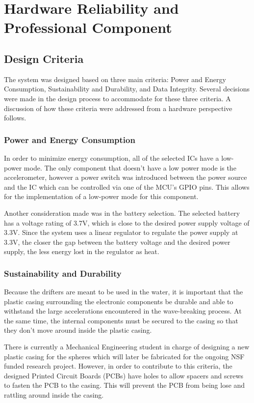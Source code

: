 \section{Hardware Reliability and Professional Component}

\subsection{Design Criteria}
The system was designed based on three main criteria: Power and Energy Consumption, Sustainability and Durability, and Data Integrity.  Several decisions were made in the design process to accommodate for these three criteria.  A discussion of how these criteria were addressed from a hardware perspective follows.

\subsubsection{Power and Energy Consumption}
In order to minimize energy consumption, all of the selected ICs have a low-power mode.  The only component that doesn't have a low power mode is the accelerometer, however a power switch was introduced between the power source and the IC which can be controlled via one of the MCU's GPIO pins.  This allows for the implementation of a low-power mode for this component.

Another consideration made was in the battery selection.  The selected battery has a voltage rating of 3.7V, which is close to the desired power supply voltage of 3.3V.  Since the system uses a linear regulator to regulate the power supply at 3.3V, the closer the gap between the battery voltage and the desired power supply, the less energy lost in the regulator as heat.

\subsubsection{Sustainability and Durability}
Because the drifters are meant to be used in the water, it is important that the plastic casing surrounding the electronic components be durable and able to withstand the large accelerations encountered in the wave-breaking process.  At the same time, the internal components must be secured to the casing so that they don't move around inside the plastic casing.

There is currently a Mechanical Engineering student in charge of designing a new plastic casing for the spheres which will later be fabricated for the ongoing NSF funded research project.  However, in order to contribute to this criteria, the designed Printed Circuit Boards (PCBs) have holes to allow spacers and screws to fasten the PCB to the casing.  This will prevent the PCB from being lose and rattling around inside the casing.

